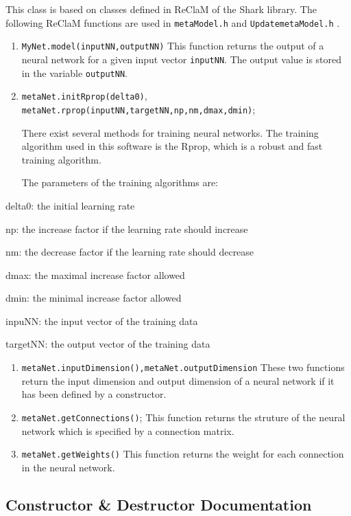This class is based on classes defined in Re\-Cla\-M of the Shark library. The following Re\-Cla\-M functions are used in {\tt meta\-Model.h} and {\tt Updatemeta\-Model.h} .\begin{enumerate}
\item 
{\tt My\-Net.model(input\-NN,output\-NN)} This function returns the output of a neural network for a given input vector {\tt input\-NN}. The output value is stored in the variable {\tt output\-NN}. \item 
{\tt meta\-Net.init\-Rprop(delta0)}, {\tt meta\-Net.rprop(input\-NN,target\-NN,np,nm,dmax,dmin)}; \par
 There exist several methods for training neural networks.  The training algorithm used in this software is the Rprop, which is a robust and fast training algorithm. \par
 The parameters of the training algorithms are:\end{enumerate}
\begin{CompactItemize}
\item 
delta0: the initial learning rate\item 
np: the increase factor if the learning rate should increase\item 
nm: the decrease factor if the learning rate should decrease\item 
dmax: the maximal increase factor allowed\item 
dmin: the minimal increase factor allowed\item 
inpu\-NN: the input vector of the training data\item 
target\-NN: the output vector of the training data \end{CompactItemize}
\begin{enumerate}
\item 
{\tt meta\-Net.input\-Dimension(),meta\-Net.output\-Dimension} These two functions return the input dimension and output dimension of a neural network if it has been defined by a constructor.\item 
{\tt meta\-Net.get\-Connections()}; This function returns the struture of the neural network which is specified by a connection matrix.\item 
{\tt meta\-Net.get\-Weights()} This function returns the weight for each connection in the neural network. \end{enumerate}




\subsection{Constructor \& Destructor Documentation}
